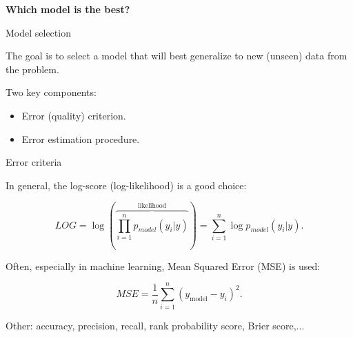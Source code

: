 \begin{frame}
\begin{analysis}
\bigskip

\textbf{Which model is the best?}

\bigskip

\bigskip

\end{analysis}
\end{frame}

\begin{frame}{Model selection}

\begin{Large}

\bigskip

The goal is to select a model that will best generalize to new (unseen) data from the problem.

\bigskip

Two key components:

\begin{itemize}
\item Error (quality) criterion.
\item Error estimation procedure.
\end{itemize}
\end{Large}

\bigskip

\end{frame}

\begin{frame}{Error criteria}

In general, the log-score (log-likelihood) is a good choice:

$$LOG = \log \left(\overbrace{\prod_{i=1}^n p_{model}(y_i|y)}^{\text{likelihood}}\right) = \sum_{i=1}^n \log p_{model}(y_i|y).$$

\bigskip

Often, especially in machine learning, Mean Squared Error (MSE) is used:

$$MSE = \frac{1}{n} \sum_{i=1}^n (y_{\text{model}} - y_i)^2.$$

\bigskip

\bigskip

Other: accuracy, precision, recall, rank probability score, Brier score,...

\end{frame}

